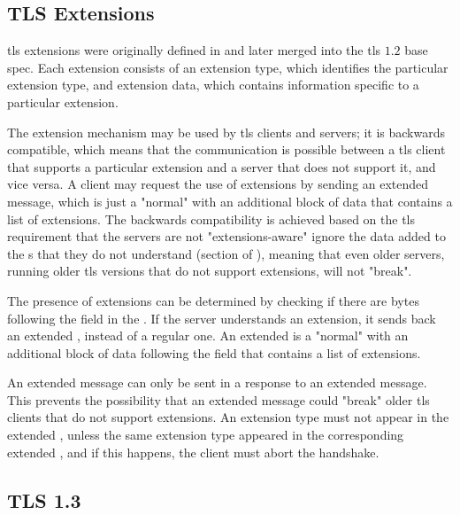 \documentclass{llncs}
\begin{document}
\subsection{TLS Extensions}

\gls{tls} extensions were originally defined in \cite{RFC4366}
and later merged into the \gls{tls} $1.2$ base spec. Each extension consists of an
extension type, which identifies the particular extension type, and extension data,
which contains information specific to a particular extension.

The extension mechanism may be used by \gls{tls} clients and servers; it is backwards
compatible, which means that the communication is possible between a \gls{tls} client that supports a particular extension and a server that does not support it,
and vice versa. A client may request the use of extensions by sending an extended 
message, which is just a "normal"  with an additional
block of data that contains a list of extensions. The backwards compatibility is achieved based on the \gls{tls}
requirement that the servers are not "extensions-aware" ignore the data
added to the s that they do not understand (section  of \cite{RFC2246}),
meaning that even older servers, running older \gls{tls} versions that do not support extensions, will not "break".

The presence of extensions can be determined by checking if there are bytes
following the  field in the .
If the server understands an extension, it sends back an extended ,
instead of a regular one. An extended  is a "normal"
 with an additional block of data following the
 field that contains a list of extensions.

An extended  message can only be sent in a response to an
extended  message. This prevents the possibility that an extended
 message could "break" older \gls{tls} clients that do not
support extensions. An extension type must not appear in the
extended , unless the same extension type appeared in the
corresponding extended , and if this happens, the client must abort the handshake.

\subsection{TLS 1.3}
\end{document}
